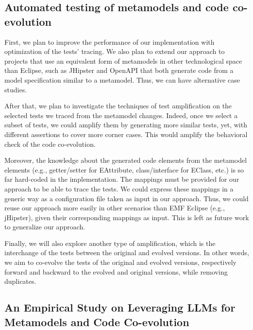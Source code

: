 
\subsection{Automated testing of metamodels and code co-evolution}
First, we plan to improve the performance of our implementation with optimization of the tests' tracing.  %
We also plan to extend our approach to projects that use an equivalent form of metamodels in other technological space than Eclipse, such as JHipster and OpenAPI that both generate code from a model specification similar to a metamodel. Thus, we can have alternative case studies. 

After that, we plan to investigate the techniques of test amplification on the selected tests we traced from the metamodel changes. Indeed, once we select a subset of tests, we could amplify them by generating more similar tests, yet, with different assertions to cover more corner cases. This would amplify the behavioral check of the code co-evolution. 

Moreover, the knowledge about the generated code elements from the metamodel elements (e.g., getter/setter for EAttribute, class/interface for EClass, etc.) is so far hard-coded in the implementation. The mappings must be provided for our approach to be able to trace the tests. We could express these mappings in a generic way as a configuration file taken as input in our approach. Thus, we could reuse our approach more easily in other scenarios than EMF Eclipse (e.g., jHipster), given their corresponding mappings as input. This is left as future work to generalize our approach.

Finally, we will also explore another type of amplification, which is the interchange of the tests between the original and evolved versions. In other words, we aim to co-evolve the tests of the original and evolved versions, respectively forward and backward to the evolved and original versions, while removing duplicates. 




\subsection{An Empirical Study on Leveraging LLMs for Metamodels and Code Co-evolution}



